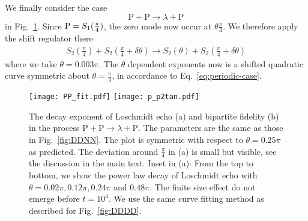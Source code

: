 We finally consider the case
\begin{equation}
\text{P}+\text{P}\rightarrow\lambda+\text{P}
\end{equation}
in Fig.~\ref{fig:PPPP}. Since ${\rm P} = S_1( \frac{\pi}{4} ) $, the zero mode now occur at $\theta \frac{\pi}{4}$. We therefore apply the shift regulator there 
\begin{equation}
\begin{aligned}
\label{eq:approx_DNDN}
S_2\left(\frac{\pi}{4}\right)+S_2\left(\frac{\pi}{4}+\delta\theta\right)\rightarrow S_2(\theta)+S_2\left(\frac{\pi}{4}+\delta\theta\right)
\end{aligned}
\end{equation}
where we take $\theta=0.003\pi$. The $\theta$ dependent exponents now is a shifted quadratic curve symmetric about $ \theta = \frac{\pi}{4}$, in accordance to Eq.~\eqref{eq:periodic-case}.

\begin{figure}
  \centering
  \texttt{[image: PP\_fit.pdf]}
    \texttt{[image: p\_p2tan.pdf]}
    \caption{The decay exponent of Loschmidt echo (a) and bipartite fidelity (b) in the process $\text{P}+\text{P}\rightarrow\lambda+\text{P}$. The parameters are the same as those in Fig.~\ref{fig:DDNN}. The plot is symmetric with respect to $\theta=0.25\pi$ as predicted. The deviation around $\frac{\pi}{4}$ in (a) is small but visible, see the discussion in the main text. Inset in (a): From the top to bottom, we show the power law decay of Loschmidt echo with $\theta=0.02\pi, 0.12\pi,0.24\pi$ and $0.48\pi$. The finite size effect do not emerge before $t=10^{4}$. We use the same curve fitting method as described for Fig.~\ref{fig:DDDD}.}
    \label{fig:PPPP}
\end{figure}


